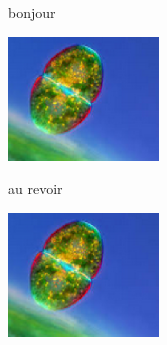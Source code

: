 \begin{frame}
\begin{minipage}{0.45\linewidth}
bonjour

\includegraphics[width=0.3\textwidth]{fig1}
\end{minipage}
\hspace{0.05\linewidth}
\begin{minipage}{0.45\linewidth}
au revoir

\hyperlink{départ}{}

\href{run:geogebra.ggb}{}

\includegraphics[width=0.3\textwidth]{fig1}
\end{minipage}
\end{frame}



